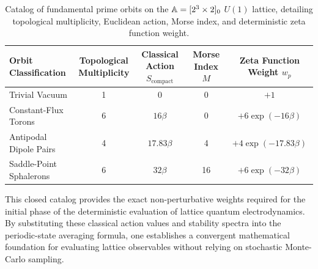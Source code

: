 \documentclass[11pt,a4paper]{article}
\begin{document}
\begin{table}[h!]
\centering
\caption{Catalog of fundamental prime orbits on the $\mathbb{A}=[2^3 \times 2]_0$ {\pcell} $U(1)$ lattice, detailing topological multiplicity,  Euclidean action, Morse index, and deterministic zeta function weight.}
\label{tab:zeta_catalog}
\begin{tabular}{@{}lcccc@{}}
\toprule
\shortstack[l]{Orbit\\Classification} & \shortstack[c]{Topological\\Multiplicity} & \shortstack[c]{Classical Action\\$S_{\text{compact}}$} & \shortstack[c]{Morse\\Index $M$} & \shortstack[c]{Zeta Function\\Weight $w_p$} \\
\midrule
Trivial Vacuum & 1 & $0$ & 0 & $+1$ \\
Constant-Flux Torons & 6 & $16\beta$ & 0 & $+6 \exp(-16\beta)$ \\
Antipodal Dipole Pairs & 4 & $17.83\beta$ & 4 & $+4 \exp(-17.83\beta)$ \\
Saddle-Point Sphalerons & 6 & $32\beta$ & 16 & $+6 \exp(-32\beta)$ \\
\bottomrule
\end{tabular}
\end{table}

This closed catalog provides the exact non-perturbative weights required for the initial phase of the deterministic evaluation of lattice quantum electrodynamics. By substituting these classical action values and stability spectra into the periodic-state averaging formula, one establishes a convergent mathematical foundation for evaluating lattice observables without relying on stochastic Monte-Carlo sampling.


\printbibliography[heading=subbibintoc,title={References}]
\end{document}
